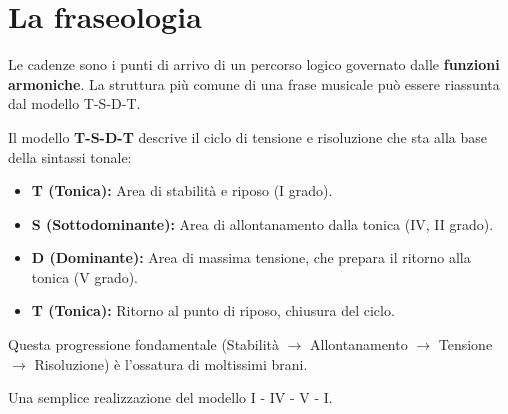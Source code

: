 	\section{La fraseologia}
	\label{sec:fraseologia}
	
	Le cadenze sono i punti di arrivo di un percorso logico governato dalle \textbf{funzioni armoniche}. La struttura più comune di una frase musicale può essere riassunta dal modello T-S-D-T.
	
	\begin{regola}
		\label{reg:tsdt}
		Il modello \textbf{T-S-D-T} descrive il ciclo di tensione e risoluzione che sta alla base della sintassi tonale:
		\begin{itemize}
			\item \textbf{T (Tonica):} Area di stabilità e riposo (I grado).
			\item \textbf{S (Sottodominante):} Area di allontanamento dalla tonica (IV, II grado).
			\item \textbf{D (Dominante):} Area di massima tensione, che prepara il ritorno alla tonica (V grado).
			\item \textbf{T (Tonica):} Ritorno al punto di riposo, chiusura del ciclo.
		\end{itemize}
		Questa progressione fondamentale (Stabilità $\rightarrow$ Allontanamento $\rightarrow$ Tensione $\rightarrow$ Risoluzione) è l'ossatura di moltissimi brani.
	\end{regola}
	
	\begin{esempio}
		\label{ex:tsdt}
		Una semplice realizzazione del modello I - IV - V - I.
	\end{esempio}
	
	

